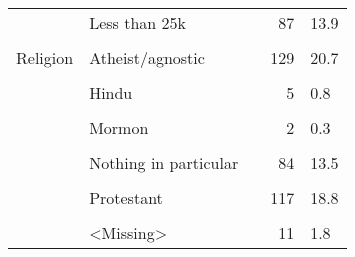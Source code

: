 \documentclass[border=1mm]{standalone}
\begin{document}
\begin{table}[!h]
\begin{tabular}[t]{lllrl}
 & Less than 25k &  & 87 & 13.9\\
\addlinespace
\cellcolor{gray!10}{} & \cellcolor{gray!10}{<Missing>} & \cellcolor{gray!10}{} & \cellcolor{gray!10}{3} & \cellcolor{gray!10}{0.5}\\
Religion & Atheist/agnostic &  & 129 & 20.7\\
\cellcolor{gray!10}{} & \cellcolor{gray!10}{Buddhist} & \cellcolor{gray!10}{} & \cellcolor{gray!10}{8} & \cellcolor{gray!10}{1.3}\\
 & Hindu &  & 5 & 0.8\\
\cellcolor{gray!10}{} & \cellcolor{gray!10}{Jewish} & \cellcolor{gray!10}{} & \cellcolor{gray!10}{11} & \cellcolor{gray!10}{1.8}\\
\addlinespace
 & Mormon &  & 2 & 0.3\\
\cellcolor{gray!10}{} & \cellcolor{gray!10}{Muslim} & \cellcolor{gray!10}{} & \cellcolor{gray!10}{16} & \cellcolor{gray!10}{2.6}\\
 & Nothing in particular &  & 84 & 13.5\\
\cellcolor{gray!10}{} & \cellcolor{gray!10}{Orthodox (Greek or Russian)} & \cellcolor{gray!10}{} & \cellcolor{gray!10}{4} & \cellcolor{gray!10}{0.6}\\
 & Protestant &  & 117 & 18.8\\
\addlinespace
\cellcolor{gray!10}{} & \cellcolor{gray!10}{Roman Catholic} & \cellcolor{gray!10}{} & \cellcolor{gray!10}{237} & \cellcolor{gray!10}{38.0}\\
 & <Missing> &  & 11 & 1.8\\
\bottomrule
\end{tabular}
\end{table}
\end{document}
